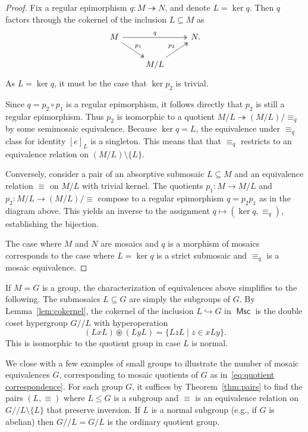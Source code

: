 \documentclass[reqno]{amsart}
\newcommand{\cat}[1]{\ensuremath{\mathsf{#1}}}
\DeclareMathOperator{\Msc}{\cat{Msc}}
\newcommand{\ostar}{\circledast}
\newcommand{\modmod}{/\!/}
\numberwithin{equation}{section}
\theoremstyle{plain}
\theoremstyle{definition}
\begin{document}
\begin{proof}
Fix a regular epimorphism $q \colon M \twoheadrightarrow N$, and denote $L = \ker q$. Then $q$ factors through the cokernel of the inclusion $L \subseteq M$ as
\[
\begin{tikzcd}
M \ar[rr, twoheadrightarrow, "q"] \ar[dr, twoheadrightarrow, "p_1"] & & N. \\
& M/L \ar[ur, twoheadrightarrow, "p_2"] & 
\end{tikzcd}
\]
As $L = \ker q$, it must be the case that $\ker p_2$ is trivial.

Since $q = p_2 \circ p_1$ is a regular epimorphism, it follows directly that $p_2$ is still a regular epimorphism. Thus $p_2$ is isomorphic to a quotient $M/L \twoheadrightarrow (M/L)/\equiv_q$ by some semimosaic equivalence. Because $\ker q = L$, the equivalence under $\equiv_q$ class for identity $[e]_L$ is a singleton. This means that that $\equiv_q$ restricts to an equivalence relation on $(M/L) \setminus\{L\}$.

Conversely, consider a pair of an absorptive submosaic $L \subseteq M$ and an equivalence relation $\equiv$ on $M/L$ with trivial kernel. The quotients $p_1 \colon M \to M/L$ and $p_2 \colon M/L \to (M/L)/\equiv$ compose to a regular epimorphism $q = p_2 p_1$ as in the diagram above. This yields an inverse to the assignment $q \mapsto (\ker q, \equiv_q)$, establishing the bijection. 

The case where $M$ and $N$ are mosaics and $q$ is a morphism of mosaics corresponds to the case where $L = \ker q$ is a strict submosaic and $\equiv_q$ is a mosaic equivalence.
\end{proof}



If $M = G$ is a group, the characterization of equivalences above simplifies to the following. The submosaics $L \subseteq G$ are simply the subgroups of $G$. By Lemma~\ref{lem:cokernel}, the cokernel of the inclusion $L \hookrightarrow G$ in $\Msc$ is the double coset hypergroup $G \modmod L$ with hyperoperation
\[
(LxL) \ostar (LyL) = \{LzL \mid z \in xLy\}.
\]
This is isomorphic to the quotient group in case $L$ is normal. 

We close with a few examples of small groups to illustrate the number of mosaic equivalences $G$, corresponding to mosaic quotients of $G$ as in~\eqref{eq:quotient correspondence}. For each group $G$, it suffices by Theorem~\ref{thm:pairs} to find the pairs $(L, \equiv)$ where $L \leq G$ is a subgroup and $\equiv$ is an equivalence relation on $G\modmod L \setminus \{L\}$ that preserve inversion. If $L$ is a normal subgroup (e.g., if $G$ is abelian) then $G \modmod L = G/L$ is the ordinary quotient group.
\end{document}
